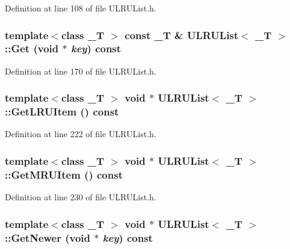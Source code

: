 Definition at line 108 of file ULRUList.h.\hypertarget{class_u_l_r_u_list_7d10feee35c0cc4946e21347ef6cb3d2}{
\subsubsection[{Get}]{\setlength{\rightskip}{0pt plus 5cm}template$<$class \_\-T $>$ const \_\-T \& {\bf ULRUList}$<$ \_\-T $>$::Get (void $\ast$ {\em key}) const}}
\label{class_u_l_r_u_list_7d10feee35c0cc4946e21347ef6cb3d2}




Definition at line 170 of file ULRUList.h.\hypertarget{class_u_l_r_u_list_3871983b8a1a2b18217bca744e00dc55}{
\subsubsection[{GetLRUItem}]{\setlength{\rightskip}{0pt plus 5cm}template$<$class \_\-T $>$ void $\ast$ {\bf ULRUList}$<$ \_\-T $>$::GetLRUItem () const}}
\label{class_u_l_r_u_list_3871983b8a1a2b18217bca744e00dc55}




Definition at line 222 of file ULRUList.h.\hypertarget{class_u_l_r_u_list_bfe1f6cb202121429771b13bc90d6e91}{
\subsubsection[{GetMRUItem}]{\setlength{\rightskip}{0pt plus 5cm}template$<$class \_\-T $>$ void $\ast$ {\bf ULRUList}$<$ \_\-T $>$::GetMRUItem () const}}
\label{class_u_l_r_u_list_bfe1f6cb202121429771b13bc90d6e91}




Definition at line 230 of file ULRUList.h.\hypertarget{class_u_l_r_u_list_1ce92559ced183f4cece749b937dda2e}{
\subsubsection[{GetNewer}]{\setlength{\rightskip}{0pt plus 5cm}template$<$class \_\-T $>$ void $\ast$ {\bf ULRUList}$<$ \_\-T $>$::GetNewer (void $\ast$ {\em key}) const}}
\label{class_u_l_r_u_list_1ce92559ced183f4cece749b937dda2e}




